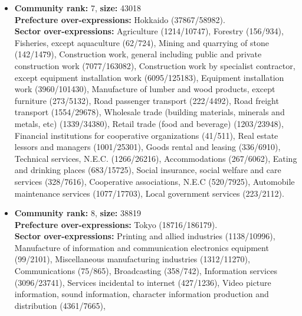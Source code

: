 \documentclass[pre,floatfix,twocolumn,showpacs,a4paper,nofootinbib]{revtex4}
\begin{document}
\begin {itemize}
 Fukui (539/11599), Yamanashi (519/9981), Gifu (857/20230), Shizuoka (1514/35806), Mie (741/17747), Okayama (963/20023), Hiroshima (1209/30651),
 Saga (358/7873), Kumamoto (767/16358), Oita (671/12738), Miyazaki (535/12013).\\
 {\bf Sector over-expressions:} Manufacture of transport equipment (369/6623), Road passenger transport (1199/4492),  Wholesale trade
 (machinery and equipment) (3031/40672), Retail trade (machinery and equipment) (15483/41319), Insurance institutions,
 including insurance agents, brokers and services (4805/6234),  Goods rental and leasing (407/6910), School education (312/3416),
 Automobile maintenance services (8607/17703).
 \item {\bf Community rank:} 7, {\bf size:} 43018\\
 {\bf Prefecture over-expressions:} Hokkaido (37867/58982).\\
 {\bf Sector over-expressions:} Agriculture (1214/10747), Forestry (156/934), Fisheries, except aquaculture (62/724), 
 Mining and quarrying of stone (142/1479), Construction work, general including public and private construction work (7077/163082),
Construction work by specialist contractor, except equipment installation work (6095/125183), Equipment installation work (3960/101430), 
Manufacture of lumber and wood products, except furniture (273/5132), Road passenger transport (222/4492), Road freight transport (1554/29678),
Wholesale trade  (building materials, minerals and metals, etc) (1339/34380), Retail trade (food and beverage) (1203/23948), 
Financial institutions for cooperative organizations (41/511), Real estate lessors and managers (1001/25301), 
Goods rental and leasing (336/6910), Technical services, N.E.C. (1266/26216), Accommodations (267/6062),
Eating and drinking places (683/15725), Social insurance, social welfare and care services (328/7616), 
Cooperative associations, N.E.C (520/7925), Automobile maintenance services (1077/17703), Local government services (223/2112).
\item {\bf Community rank:} 8, {\bf size:} 38819\\
 {\bf Prefecture over-expressions:} Tokyo (18716/186179).\\
 {\bf Sector over-expressions:} Printing and allied industries (1138/10996), Manufacture of information and communication electronics equipment (99/2101),
 Miscellaneous manufacturing industries (1312/11270), Communications (75/865), Broadcasting (358/742), Information services (3096/23741),
 Services incidental to internet (427/1236), Video picture information, sound information, character information production and distribution (4361/7665),

\end{itemize}
\end{document}
